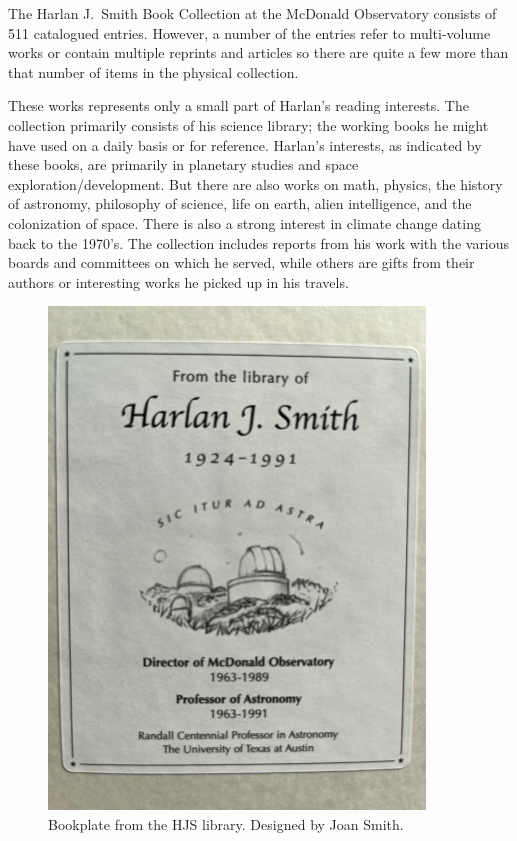 

The Harlan J.~Smith Book Collection at the McDonald Observatory
consists of 511 catalogued entries. However, a number of the entries
refer to multi-volume works or contain multiple reprints and articles
so there are quite a few more than that number of items in the
physical collection.

These works represents only a small part of Harlan's reading
interests.  The collection primarily consists of his science library;
the working books he might have used on a daily basis or for
reference.  Harlan's interests, as indicated by these books, are
primarily in planetary studies and space exploration/development. But
there are also works on math, physics, the history of astronomy,
philosophy of science, life on earth, alien intelligence, and the
colonization of space. There is also a strong interest in climate
change dating back to the 1970's.  The collection includes reports
from his work with the various boards and committees on which he
served, while others are gifts from their authors or interesting
works he picked up in his travels.

\begin{figure}
  \centering
  \includegraphics[height=0.34\textheight]{hjs_bookplate_small.png}
  {\small Bookplate from the HJS library. Designed by Joan Smith.}
  \label{fig:bookplate}
\end{figure}

